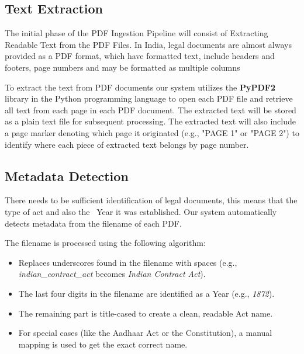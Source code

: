 \documentclass[12pt,a4paper]{article}
\begin{document}
\subsection{Text Extraction}

The initial phase of the PDF Ingestion Pipeline will consist of Extracting Readable Text from the PDF Files. In India, legal documents are almost always provided as a PDF format, which have formatted text, include headers and footers, page numbers and may be formatted as multiple columns

To extract the text from PDF documents our system utilizes the \textbf{PyPDF2} library in the Python programming language to open each PDF file and retrieve all text from each page in each PDF document. The extracted text will be stored as a plain text file for subsequent processing. The extracted text will also include a page marker denoting which page it originated (e.g., "PAGE 1" or "PAGE 2") to identify where each piece of extracted text belongs by page number.

% 



\subsection{Metadata Detection}

There needs to be sufficient identification of legal documents, this means that the type of act and also the ~Year it was established. Our system automatically detects metadata from the filename of each PDF.

The filename is processed using the following algorithm:
\begin{itemize}
  \item Replaces underscores found in the filename with spaces (e.g., \textit{indian\_contract\_act} becomes \textit{Indian Contract Act}).
  \item The last four digits in the filename are identified as a Year (e.g., \textit{1872}).
  \item The remaining part is title-cased to create a clean, readable Act name.
  \item For special cases (like the Aadhaar Act or the Constitution), a manual mapping is used to get the exact correct name.
\end{itemize}
\end{document}
